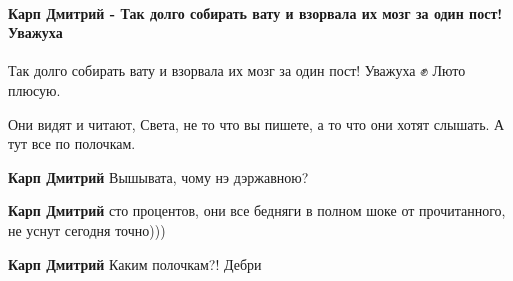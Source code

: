  
 
 
 
 
\paragraph{Карп Дмитрий - Так долго собирать вату и взорвала их мозг за один пост! Уважуха}

\begin{itemize}
 
Так долго собирать вату и взорвала их мозг за один пост! Уважуха ✊ Люто
плюсую.

Они видят и читают, Света, не то что вы пишете, а то что они хотят слышать. А
тут все по полочкам.

\begin{itemize}
 
\textbf{Карп Дмитрий} Вышывата, чому нэ дэржавною?

 
\textbf{Карп Дмитрий} сто процентов, они все бедняги в полном шоке от прочитанного, не уснут сегодня точно)))

 
\textbf{Карп Дмитрий}
Каким полочкам?! Дебри

 

\end{itemize}
\end{itemize}
